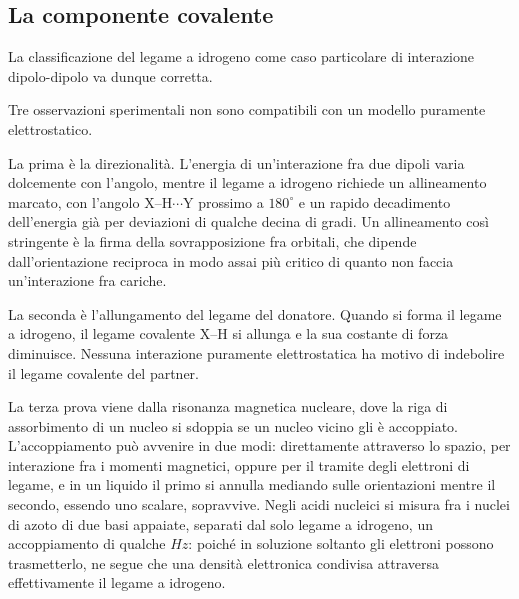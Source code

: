 \subsection{La componente covalente}
 
La classificazione del legame a idrogeno come caso particolare di interazione dipolo-dipolo va dunque corretta.

Tre osservazioni sperimentali non sono compatibili con un modello puramente elettrostatico.
 
La prima è la direzionalità.
L'energia di un'interazione fra due dipoli varia dolcemente con l'angolo, mentre il legame a idrogeno richiede un allineamento marcato, con l'angolo $\mathrm{X}$--$\mathrm{H}\cdots\mathrm{Y}$ prossimo a $180^\circ$ e un rapido decadimento dell'energia già per deviazioni di qualche decina di gradi.
Un allineamento così stringente è la firma della sovrapposizione fra orbitali, che dipende dall'orientazione reciproca in modo assai più critico di quanto non faccia un'interazione fra cariche.
 
La seconda è l'allungamento del legame del donatore.
Quando si forma il legame a idrogeno, il legame covalente $\mathrm{X}$--$\mathrm{H}$ si allunga e la sua costante di forza diminuisce.
Nessuna interazione puramente elettrostatica ha motivo di indebolire il legame covalente del partner.
 
La terza prova viene dalla risonanza magnetica nucleare, dove la riga di assorbimento di un nucleo si sdoppia se un nucleo vicino gli è accoppiato.
L'accoppiamento può avvenire in due modi: direttamente attraverso lo spazio, per interazione fra i momenti magnetici, oppure per il tramite degli elettroni di legame, e in un liquido il primo si annulla mediando sulle orientazioni mentre il secondo, essendo uno scalare, sopravvive.
Negli acidi nucleici si misura fra i nuclei di azoto di due basi appaiate, separati dal solo legame a idrogeno, un accoppiamento di qualche $Hz$: poiché in soluzione soltanto gli elettroni possono trasmetterlo, ne segue che una densità elettronica condivisa attraversa effettivamente il legame a idrogeno.\\

